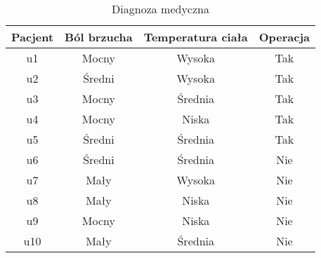 \documentclass[a4paper]{article}
\begin{document}
\begin{table}[h]
\centering\caption{Diagnoza medyczna}
\begin{tabular}{c|c c c}
        \hline
        \hline
        Pacjent & Ból brzucha & Temperatura ciała & Operacja\\
        \hline
        u1 & Mocny & Wysoka & Tak\\
        u2 & Średni & Wysoka & Tak\\
        u3 & Mocny & Średnia & Tak\\
        u4 & Mocny & Niska & Tak\\
        u5 & Średni & Średnia & Tak\\
        u6 & Średni & Średnia & Nie\\
        u7 & Mały & Wysoka & Nie\\
        u8 & Mały & Niska & Nie\\
        u9 & Mocny & Niska & Nie\\
        u10 & Mały & Średnia & Nie\\
        \hline
        \hline
\end{tabular}        
\end{table}        
\end{document}
